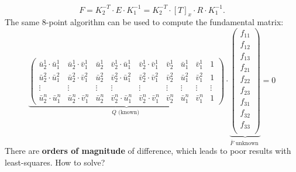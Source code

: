 \documentclass[a4paper,12 pt]{article}
\theoremstyle{definition}
\theoremstyle{remark}
\theoremstyle{definition}
\theoremstyle{definition}
\theoremstyle{definition}
\theoremstyle{remark}
\theoremstyle{definition}
\begin{document}
\begin{equation}
F=K_2^{-T}\cdot E \cdot K_1^{-1}=K_2^{-T}\cdot [T]_x\cdot R \cdot K_1^{-1}.
\end{equation}
The same 8-point algorithm can be used to compute the fundamental matrix:
\begin{equation}
\underbrace{\begin{pmatrix}
\bar{u}_2^1\cdot \bar{u}_1^1&\bar{u}_2^1\cdot \bar{v}_1^1&\bar{u}_2^1&\bar{v}_2^1\cdot \bar{u}_1^1&\bar{v}_2^1\cdot \bar{v}_1^1&\bar{v}_2^1&\bar{u}_1^1&\bar{v}_1^1&1\\
\bar{u}_2^2\cdot \bar{u}_1^2&\bar{u}_2^2\cdot \bar{v}_1^2&\bar{u}_2^2&\bar{v}_2^2\cdot \bar{u}_1^2&\bar{v}_2^2\cdot \bar{v}_1^2&\bar{v}_2^2&\bar{u}_1^2&\bar{v}_1^2&1\\
\vdots &\vdots &\vdots &\vdots &\vdots &\vdots &\vdots &\vdots &\vdots \\
\bar{u}_2^n\cdot \bar{u}_1^n&\bar{u}_2^n\cdot \bar{v}_1^n&\bar{u}_2^n&\bar{v}_2^n\cdot \bar{u}_1^n&\bar{v}_2^n\cdot \bar{v}_1^n&\bar{v}_2^n&\bar{u}_1^n&\bar{v}_1^n&1
\end{pmatrix}}_{Q \text{ (known) }}\cdot  \underbrace{\begin{pmatrix}
f_{11}\\
f_{12}\\
f_{13}\\
f_{21}\\
f_{22}\\
f_{23}\\
f_{31}\\
f_{32}\\
f_{33}\\
 \end{pmatrix}}_{\bar{F} \text{ unknown }}=0
\end{equation}
There are \textbf{orders of magnitude} of difference, which leads to poor results with least-squares. How to solve?
\end{document}
